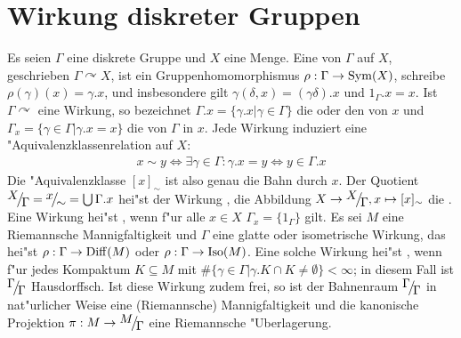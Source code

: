 \section{Wirkung diskreter Gruppen}
Es seien $\Gamma$ eine diskrete Gruppe und $X$ eine Menge.
Eine  von $\Gamma$ auf $X$, geschrieben $\Gamma \curvearrowright X$, ist ein Gruppenhomomorphismus $\rho: \Gamma \to \Sym(X)$, schreibe $\rho(\gamma)(x) = \gamma.x$, und insbesondere gilt $\gamma(\delta, x) = (\gamma \delta).x$ und $1_\Gamma.x = x$.
Ist $\Gamma \curvearrowright$ eine Wirkung, so bezeichnet $\Gamma.x = \{\gamma.x | \gamma \in \Gamma\}$ die  oder den  von $x$ und $\Gamma_x = \{\gamma \in \Gamma | \gamma.x = x \}$ die  von $\Gamma$ in $x$.
Jede Wirkung induziert eine "Aquivalenzklassenrelation auf $X$:
\begin{align*}
  x \sim y \Leftrightarrow \exists \gamma \in \Gamma: \gamma.x = y \Leftrightarrow y \in \Gamma.x
\end{align*}
Die "Aquivalenzklasse $[x]_\sim$ ist also genau die Bahn durch $x$.
Der Quotient $\FakRaum{X}{\Gamma} = \FakRaum{x}{\sim} = \bigcup \Gamma.x$ hei"st  der Wirkung , die Abbildung $X \to \FakRaum{X}{\Gamma}, x \mapsto [x]_\sim$ die .
Eine Wirkung hei"st , wenn f"ur alle $x \in X$ $\Gamma_x = \{ 1_\Gamma \}$ gilt.
Es sei $M$ eine Riemannsche Mannigfaltigkeit und $\Gamma$ eine glatte oder isometrische Wirkung, das hei"st $\rho: \Gamma \to \Diff(M)$ oder $\rho: \Gamma \to \Iso(M)$.
Eine solche Wirkung hei"st , wenn f"ur jedes Kompaktum $K \subseteq M$ mit $\# \{ \gamma \in \Gamma | \gamma.K \cap K \ne \emptyset \} < \infty$; in diesem Fall ist $\FakRaum{\Gamma}{\Gamma}$ Hausdorffsch.
Ist diese Wirkung zudem frei, so ist der Bahnenraum $\FakRaum{\Gamma}{\Gamma}$ in nat"urlicher Weise eine (Riemannsche) Mannigfaltigkeit und die kanonische Projektion $\pi: M \to \FakRaum{M}{\Gamma}$ eine Riemannsche "Uberlagerung.

